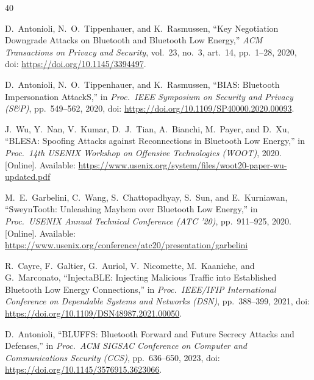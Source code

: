 \documentclass[journal]{IEEEtran}
\begin{document}


\begin{thebibliography}{40}

D.~Antonioli, N.~O.~Tippenhauer, and K.~Rasmussen,  ``Key Negotiation Downgrade Attacks on Bluetooth and Bluetooth Low Energy,''  \emph{ACM Transactions on Privacy and Security}, vol.~23, no.~3,  art.~14, pp.~1--28, 2020, doi: \url{https://doi.org/10.1145/3394497}.

D.~Antonioli, N.~O.~Tippenhauer, and K.~Rasmussen, ``BIAS: Bluetooth Impersonation AttackS,'' in \emph{Proc.\ IEEE Symposium on Security and Privacy (S\&P)}, pp.~549--562, 2020, doi: \url{https://doi.org/10.1109/SP40000.2020.00093}.

J.~Wu, Y.~Nan, V.~Kumar, D.~J.~Tian, A.~Bianchi, M.~Payer, and D.~Xu, ``BLESA: Spoofing Attacks against Reconnections in Bluetooth Low Energy,'' in \emph{Proc.\ 14th USENIX Workshop on Offensive Technologies (WOOT)}, 2020. [Online]. Available: \url{https://www.usenix.org/system/files/woot20-paper-wu-updated.pdf}


M.~E.~Garbelini, C.~Wang, S.~Chattopadhyay, S.~Sun, and E.~Kurniawan, ``SweynTooth: Unleashing Mayhem over Bluetooth Low Energy,'' in \emph{Proc.\ USENIX Annual Technical Conference (ATC '20)}, pp.~911--925, 2020. [Online]. Available: \url{https://www.usenix.org/conference/atc20/presentation/garbelini}

R.~Cayre, F.~Galtier, G.~Auriol, V.~Nicomette, M.~Kaaniche, and G.~Marconato, ``InjectaBLE: Injecting Malicious Traffic into Established Bluetooth Low Energy Connections,'' in \emph{Proc.\ IEEE/IFIP International Conference on Dependable Systems and Networks (DSN)}, pp.~388--399, 2021, doi: \url{https://doi.org/10.1109/DSN48987.2021.00050}.

D.~Antonioli, ``BLUFFS: Bluetooth Forward and Future Secrecy Attacks and Defenses,'' in \emph{Proc.\ ACM SIGSAC Conference on Computer and Communications Security (CCS)}, pp.~636--650, 2023, doi: \url{https://doi.org/10.1145/3576915.3623066}.


\end{thebibliography}
\end{document}
